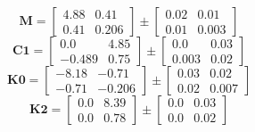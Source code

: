 \documentclass[../../report/parameterReport.tex]{subfiles}
\begin{document}
\begin{equation}
\mathbf{M}=
\left[
\begin{array}{rr}
    4.88 & 0.41\\
    0.41 & 0.206
\end{array}
\right]
\pm
\left[
\begin{array}{rr}
    0.02 & 0.01\\
    0.01 & 0.003
\end{array}
\right]
\label{eq:M}
\end{equation}
\begin{equation}
\mathbf{C1}=
\left[
\begin{array}{rr}
    0.0 & 4.85\\
    -0.489 & 0.75
\end{array}
\right]
\pm
\left[
\begin{array}{rr}
    0.0 & 0.03\\
    0.003 & 0.02
\end{array}
\right]
\label{eq:C1}
\end{equation}
\begin{equation}
\mathbf{K0}=
\left[
\begin{array}{rr}
    -8.18 & -0.71\\
    -0.71 & -0.206
\end{array}
\right]
\pm
\left[
\begin{array}{rr}
    0.03 & 0.02\\
    0.02 & 0.007
\end{array}
\right]
\label{eq:K0}
\end{equation}
\begin{equation}
\mathbf{K2}=
\left[
\begin{array}{rr}
    0.0 & 8.39\\
    0.0 & 0.78
\end{array}
\right]
\pm
\left[
\begin{array}{rr}
    0.0 & 0.03\\
    0.0 & 0.02
\end{array}
\right]
\label{eq:K2}
\end{equation}
\end{document}
